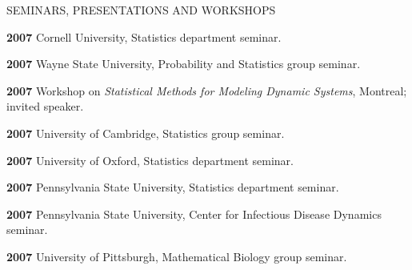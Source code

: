 \begin{mylist}{SEMINARS, PRESENTATIONS AND WORKSHOPS}
\item{\bf 2007 } Cornell University, Statistics department seminar.

\item{\bf 2007 } Wayne State University, Probability and Statistics group seminar.
 	
\item{\bf 2007 }  Workshop on {\it Statistical Methods for Modeling Dynamic Systems}, Montreal; invited speaker.

\item{\bf 2007 } University of Cambridge, Statistics group seminar.

\item{\bf 2007 } University of Oxford, Statistics department seminar.


\item{\bf 2007 } Pennsylvania State University, Statistics department seminar.

\item{\bf 2007 } Pennsylvania State University, Center for Infectious Disease Dynamics seminar.

\item{\bf 2007 } University of Pittsburgh, Mathematical Biology group seminar.


\end{mylist}

